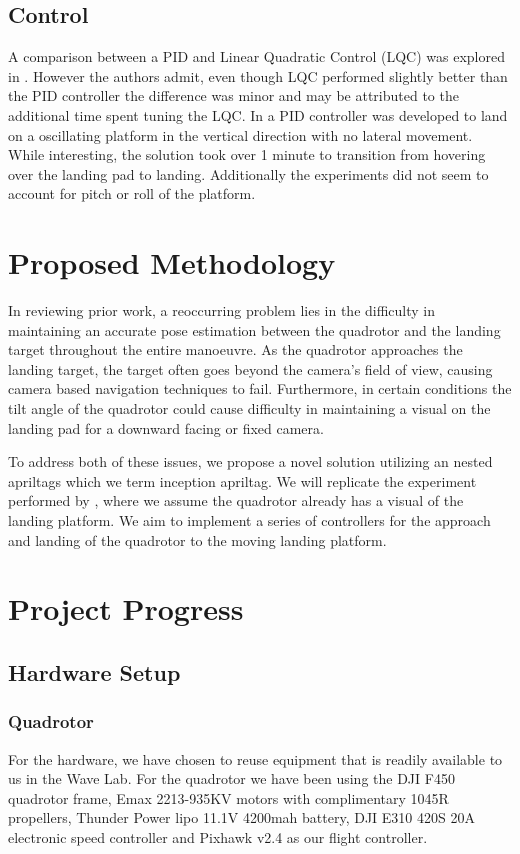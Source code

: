 \documentclass[11pt, twocolumn]{article}
\begin{document}
\subsection{Control}
A comparison between a PID and Linear Quadratic Control (LQC) was explored in \cite{Friis2009}. However the authors admit, even though LQC performed slightly better than the PID controller the difference was minor and may be attributed to the additional time spent tuning the LQC. In \cite{Herisse2012} a PID controller was developed to land on a oscillating platform in the vertical direction with no lateral movement. While interesting, the solution took over 1 minute to transition from hovering over the landing pad to landing. Additionally the experiments did not seem to account for pitch or roll of the platform.  



\section{Proposed Methodology}
In reviewing prior work, a reoccurring problem lies in the difficulty in maintaining an accurate pose estimation between the quadrotor and the landing target throughout the entire manoeuvre. As the quadrotor approaches the landing target, the target often goes beyond the camera's field of view, causing camera based navigation techniques to fail. Furthermore, in certain conditions the tilt angle of the quadrotor could cause difficulty in maintaining a visual on the landing pad for a downward facing or fixed camera. 

To address both of these issues, we propose a novel solution utilizing an nested apriltags which we term inception apriltag. We will replicate the experiment performed by \cite{Ling2014}, where we assume the quadrotor already has a visual of the landing platform. We aim to implement a series of controllers for the approach and landing of the quadrotor to the moving landing platform.



\section{Project Progress}
\subsection{Hardware Setup}
\subsubsection{Quadrotor}
For the hardware, we have chosen to reuse equipment that is readily available to us in the Wave Lab. For the quadrotor we have been using the DJI F450 quadrotor frame, Emax 2213-935KV motors with complimentary 1045R propellers, Thunder Power lipo 11.1V 4200mah battery, DJI E310 420S 20A electronic speed controller and Pixhawk v2.4 as our flight controller.
\end{document}
